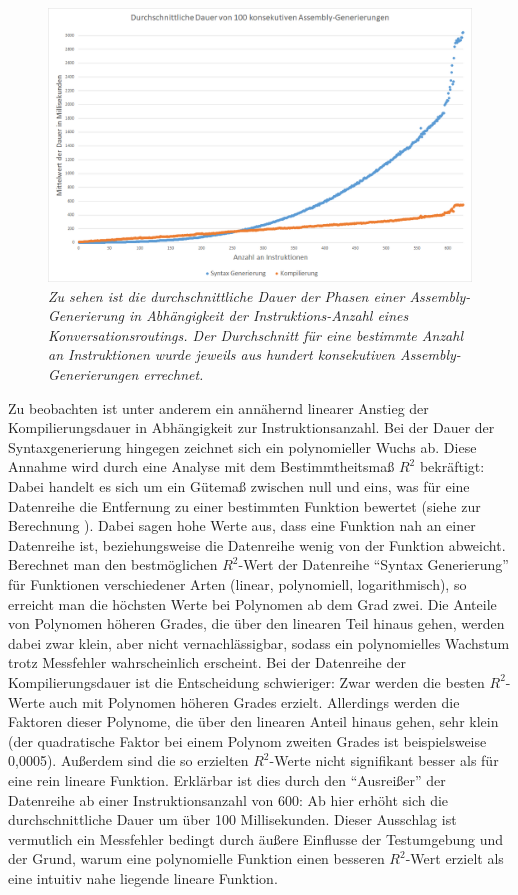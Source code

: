 \begin{figure} %
	\centering
		\includegraphics[width=\textwidth]{img/AverageTimeDiagram2.png}
	\caption[Durchschnittliche Dauer von Assembly-Generierungen]{\textit{Zu sehen ist die durchschnittliche Dauer der Phasen einer Assembly-Generierung in Abhängigkeit der Instruktions-Anzahl eines Konversationsroutings. Der Durchschnitt für eine bestimmte Anzahl an Instruktionen wurde jeweils aus hundert konsekutiven Assembly-Generierungen errechnet.}}
	\label{fig:AverageTimeDiagram}
\end{figure}
\noindent Zu beobachten ist unter anderem ein annähernd linearer Anstieg der Kompilierungsdauer in Abhängigkeit zur Instruktionsanzahl. Bei der Dauer der Syntaxgenerierung hingegen zeichnet sich ein polynomieller Wuchs ab. Diese Annahme wird durch eine Analyse mit dem Bestimmtheitsmaß $R^{2}$ bekräftigt: Dabei handelt es sich um ein Gütemaß zwischen null und eins, was für eine Datenreihe die Entfernung zu einer bestimmten Funktion bewertet (siehe zur Berechnung \cite{Pflieger:14}). Dabei sagen hohe Werte aus, dass eine Funktion nah an einer Datenreihe ist, beziehungsweise die Datenreihe wenig von der Funktion abweicht. Berechnet man den bestmöglichen $R^{2}$-Wert der Datenreihe ``Syntax Generierung'' für Funktionen verschiedener Arten (linear, polynomiell, logarithmisch), so erreicht man die höchsten Werte bei Polynomen ab dem Grad zwei. Die Anteile von Polynomen höheren Grades, die über den linearen Teil hinaus gehen, werden dabei zwar klein, aber nicht vernachlässigbar, sodass ein polynomielles Wachstum trotz Messfehler wahrscheinlich erscheint. 
\newline
Bei der Datenreihe der Kompilierungsdauer ist die Entscheidung schwieriger: Zwar werden die besten $R^{2}$-Werte auch mit Polynomen höheren Grades erzielt. Allerdings werden die Faktoren dieser Polynome, die über den linearen Anteil hinaus gehen, sehr klein (der quadratische Faktor bei einem Polynom zweiten Grades ist beispielsweise 0,0005). Außerdem sind die so erzielten $R^{2}$-Werte nicht signifikant besser als für eine rein lineare Funktion. Erklärbar ist dies durch den ``Ausreißer'' der Datenreihe ab einer Instruktionsanzahl von 600: Ab hier erhöht sich die durchschnittliche Dauer um über 100 Millisekunden. Dieser Ausschlag ist vermutlich ein Messfehler bedingt durch äußere Einflusse der Testumgebung und der Grund, warum eine polynomielle Funktion einen besseren $R^{2}$-Wert erzielt als eine intuitiv nahe liegende lineare Funktion.
